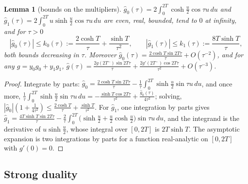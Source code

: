 \documentclass[11pt]{amsart}
\newtheorem{lemma}[theorem]{Lemma}
\theoremstyle{definition}
\theoremstyle{remark}
\newcommand{\gh}[1]{\widehat g_{#1}}
\begin{document}
\begin{lemma}[bounds on the multipliers]\label{lem:gbounds}
$\gh0(\tau)=2\int_0^{2T}\cosh\frac u2\cos\tau u\,du$ and $\gh1(\tau)=2\int_0^{2T}u\sinh\frac u2\cos\tau u\,du$
are even, real, bounded, tend to $0$ at infinity, and for $\tau>0$
\[
|\gh0(\tau)|\le k_0(\tau):=\frac{2\cosh T}{\tau}+\frac{\sinh T}{\tau^2},\qquad
|\gh1(\tau)|\le k_1(\tau):=\frac{8T\sinh T}{\tau},
\]
both bounds decreasing in $\tau$. Moreover $\gh0(\tau)=\frac{2\cosh T\sin2T\tau}{\tau}+O(\tau^{-2})$,
and for any $g=y_0g_0+y_1g_1$, $\widehat g(\tau)=\frac{2g(2T^-)\sin2T\tau}{\tau}+\frac{2g'(2T^-)\cos2T\tau}{\tau^2}+O(\tau^{-3})$.
\end{lemma}
\begin{proof}
Integrate by parts: $\gh0=\frac{2\cosh T\sin2T\tau}\tau-\frac1\tau\int_0^{2T}\sinh\frac u2\sin\tau u\,du$,
and once more, $\frac1\tau\int_0^{2T}\sinh\frac u2\sin\tau u\,du=-\frac{\sinh T\cos2T\tau}{\tau^2}+\frac{\gh0(\tau)}{4\tau^2}$;
solving, $|\gh0|(1+\frac1{4\tau^2})\le\frac{2\cosh T}\tau+\frac{\sinh T}{\tau^2}$. For $\gh1$, one
integration by parts gives $\gh1=\frac{4T\sinh T\sin2T\tau}{\tau}-\frac2\tau\int_0^{2T}\big(\sinh\frac u2+\frac u2\cosh\frac u2\big)\sin\tau u\,du$,
and the integrand is the derivative of $u\sinh\frac u2$, whose integral over $[0,2T]$ is $2T\sinh T$.
The asymptotic expansion is two integrations by parts for a function real-analytic on $[0,2T]$
with $g'(0)=0$.
\end{proof}

\subsection{Strong duality}
\end{document}
